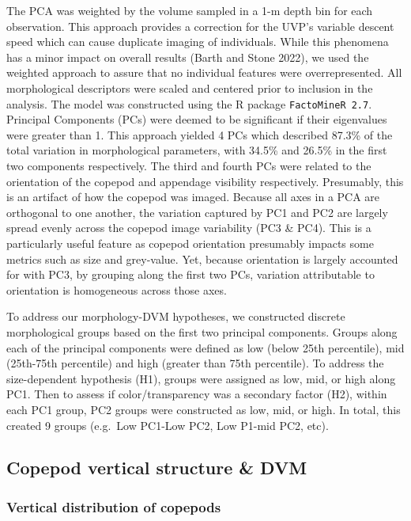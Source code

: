 \documentclass[
]{article}
\begin{document}
The PCA was weighted by the volume sampled in a 1-m depth bin for each
observation. This approach provides a correction for the UVP's variable
descent speed which can cause duplicate imaging of individuals. While
this phenomena has a minor impact on overall results (Barth and Stone
2022), we used the weighted approach to assure that no individual
features were overrepresented. All morphological descriptors were scaled
and centered prior to inclusion in the analysis. The model was
constructed using the R package \texttt{FactoMineR\ 2.7}. Principal
Components (PCs) were deemed to be significant if their eigenvalues were
greater than 1. This approach yielded 4 PCs which described 87.3\% of
the total variation in morphological parameters, with 34.5\% and 26.5\%
in the first two components respectively. The third and fourth PCs were
related to the orientation of the copepod and appendage visibility
respectively. Presumably, this is an artifact of how the copepod was
imaged. Because all axes in a PCA are orthogonal to one another, the
variation captured by PC1 and PC2 are largely spread evenly across the
copepod image variability (PC3 \& PC4). This is a particularly useful
feature as copepod orientation presumably impacts some metrics such as
size and grey-value. Yet, because orientation is largely accounted for
with PC3, by grouping along the first two PCs, variation attributable to
orientation is homogeneous across those axes.

To address our morphology-DVM hypotheses, we constructed discrete
morphological groups based on the first two principal components. Groups
along each of the principal components were defined as low (below 25th
percentile), mid (25th-75th percentile) and high (greater than 75th
percentile). To address the size-dependent hypothesis (H1), groups were
assigned as low, mid, or high along PC1. Then to assess if
color/transparency was a secondary factor (H2), within each PC1 group,
PC2 groups were constructed as low, mid, or high. In total, this created
9 groups (e.g.~Low PC1-Low PC2, Low P1-mid PC2, etc).

\hypertarget{copepod-vertical-structure-dvm}{%
\subsection{Copepod vertical structure \&
DVM}\label{copepod-vertical-structure-dvm}}

\hypertarget{vertical-distribution-of-copepods}{%
\subsubsection{Vertical distribution of
copepods}\label{vertical-distribution-of-copepods}}
\end{document}

